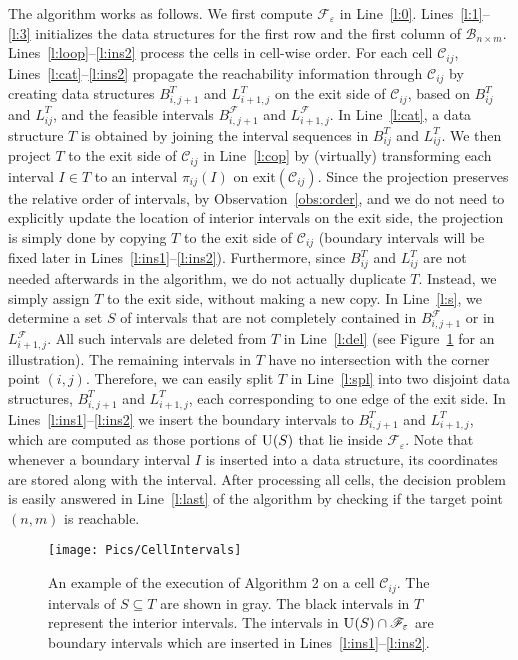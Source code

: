 \documentclass[12pt]{dalthesis}
\newcommand{\eps}{\varepsilon}
\newcommand{\CF}{{\mathscr F}}
\newcommand{\CB}{{\mathscr B}}
\newcommand{\CC}{{\mathscr C}}
\newcommand{\cell}[1]{{\CC_{#1}}}
\newcommand{\BNM}{\CB_{n \times m}}
\newcommand{\Feps}{\CF_\eps}
\newcommand{\LF}{L^\CF}
\newcommand{\BF}{B^\CF}
\newcommand{\LT}{L^{T}}
\newcommand{\BT}{B^{T}}
\newcommand{\exit}[1]{\mbox{exit}(\cell{#1})}
\newcommand{\proj}[1]{\pi_{#1}}
\newcommand{\union}{\mbox{\sc U}}
\begin{document}
The algorithm works as follows.
We first compute $\Feps$ in Line~\ref{l:0}.
Lines~\ref{l:1}--\ref{l:3} initializes the data structures 
for the first row and the first column of $\BNM$.
Lines~\ref{l:loop}--\ref{l:ins2} process the cells in cell-wise order.
For each cell $\cell{ij}$, Lines~\ref{l:cat}--\ref{l:ins2} 
propagate the reachability information through $\cell{ij}$
by creating data structures $\BT_{i,j+1}$ and $\LT_{i+1,j}$ on the exit side of $\cell{ij}$, 
based on $\BT_{ij}$ and $\LT_{ij}$, and the feasible intervals $\BF_{i,j+1}$ and $\LF_{i+1,j}$.
In Line~\ref{l:cat}, a data structure $T$ is obtained by joining the interval sequences in
$\BT_{ij}$ and $\LT_{ij}$.
We then project $T$ to the exit side of $\cell{ij}$ in Line~\ref{l:cop}
by (virtually) transforming each interval $I \in T$ to an interval $\proj{ij}(I)$ on $\exit{ij}$.
Since the projection preserves the relative order of intervals,
 by Observation~\ref{obs:order},
and we do not need to explicitly update the location of interior intervals on the exit side,
the projection is simply done by copying $T$ to the exit side of $\cell{ij}$ 
(boundary intervals will be fixed later in Lines~\ref{l:ins1}--\ref{l:ins2}).
Furthermore, since $\BT_{ij}$ and $\LT_{ij}$ are not needed afterwards in the algorithm,
we do not actually duplicate $T$. 
Instead, we simply assign $T$ to the exit side, without making a new copy.
In Line~\ref{l:s}, we determine a set $S$
of intervals that are not completely contained in $\BF_{i,j+1}$ or in $\LF_{i+1,j}$.
All such intervals are deleted from $T$ in Line~\ref{l:del}
(see Figure~\ref{fig:cell-intervals} for an illustration).
The remaining intervals in $T$ have no intersection with the corner point $(i,j)$.
Therefore, we can easily split $T$ in Line~\ref{l:spl} 
into two disjoint data structures, $\BT_{i,j+1}$ and $\LT_{i+1,j}$,
each corresponding to one edge of the exit side.
In Lines~\ref{l:ins1}--\ref{l:ins2} we insert the boundary intervals
to $\BT_{i,j+1}$ and $\LT_{i+1,j}$,
which are computed as those portions of $\union(S)$ that lie inside $\Feps$.
Note that whenever a boundary interval $I$ is inserted into a data structure,
its coordinates are stored along with the interval.
After processing all cells, the decision problem is easily answered in Line~\ref{l:last}
of the algorithm by checking if the target point $(n,m)$ is reachable.

\begin{figure}[t]
	\centering
	\texttt{[image: Pics/CellIntervals]}  
	\caption{An example of the execution of Algorithm 2 on a cell $\cell{ij}$. 
		The intervals of $S \subseteq T$ are shown in gray. 
		The black intervals in $T$ represent the interior intervals.
		The intervals in 	$\union(S) \cap \Feps$ are boundary intervals 
		which are inserted in Lines~\ref{l:ins1}--\ref{l:ins2}.
	}
	\label{fig:cell-intervals}
\end{figure}
\end{document}
